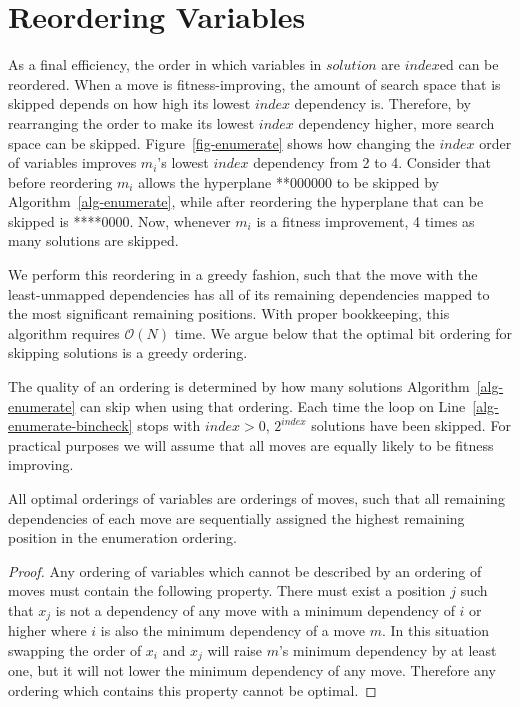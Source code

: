 \documentclass[runningheads,a4paper]{llncs}
\newcommand{\BigO}[1]{$\mathcal{O}{(#1)}$}
\begin{document}
\section{Reordering Variables}
\label{sec-reorder}
As a final efficiency, the order in which variables in $solution$ are $index$ed can be reordered.
When a move is fitness-improving,
the amount of search space that is skipped depends on how high its lowest $index$ dependency is. Therefore,
by rearranging the order to make its lowest $index$ dependency higher, more search space can be skipped. 
Figure~\ref{fig-enumerate} shows how changing the $index$ order of variables
improves $m_i$'s lowest $index$ dependency from 2 to 4. Consider that before reordering $m_i$ allows the hyperplane
**000000 to be skipped by Algorithm~\ref{alg-enumerate}, while after reordering the hyperplane that can be skipped is ****0000.
Now, whenever $m_i$ is a fitness improvement, 4 times as many solutions are skipped.

We perform this reordering in a greedy fashion, such that the move with the
least-unmapped dependencies has all of its remaining dependencies mapped to the
most significant remaining positions. With proper bookkeeping, this algorithm requires
\BigO{N} time. We argue below that the optimal bit ordering for skipping solutions
is a greedy ordering.

The quality of an ordering is determined by how many solutions
Algorithm~\ref{alg-enumerate} can skip when using that ordering.
Each time the loop on Line~\ref{alg-enumerate-bincheck} stops with $index>0$,
$2^{index}$ solutions have been skipped. For practical purposes we will
assume that all moves are equally likely to be fitness improving.

\begin{lemma}
All optimal orderings of variables are orderings of moves, such that
all remaining dependencies of each move are sequentially assigned the
highest remaining position in the enumeration ordering.
\end{lemma}

\begin{proof}
Any ordering of variables which cannot be described by an ordering of moves
must contain the following property. There must exist a position $j$
such that $x_j$ is not a dependency of any move with
a minimum dependency of $i$ or higher where $i$ is also the minimum dependency of a move $m$.
In this situation swapping the order of $x_i$ and $x_j$ will raise $m$'s
minimum dependency by at least one, but it will not lower the minimum dependency of any
move. Therefore any ordering which contains this property cannot be optimal.
\end{proof}
\end{document}
